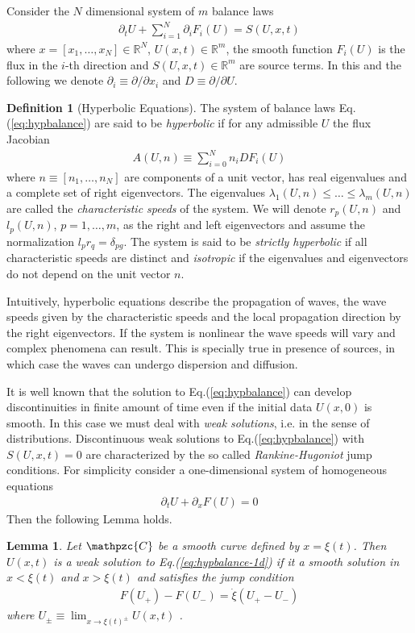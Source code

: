 \documentclass[11pt, reqno]{amsart}
\newcommand{\eqr}[1]{Eq.\thinspace(#1)}
\newcommand{\spfrac}[2]{{\partial_{#1}} {#2}}
\newcommand{\script}[1]{\mathpzc{#1}}
\newtheorem{lem}{Lemma}
\theoremstyle{definition}
\newtheorem{dfn}{Definition}
\begin{document}
Consider the $N$ dimensional system of $m$ balance laws
\begin{align}
  \spfrac{t}{U} + \sum_{i=1}^N \spfrac{i}{F_i(U)} = S(U,x,t) 
  \label{eq:hypbalance}
\end{align}
where $x = [x_1,\ldots,x_N] \in \mathbb{R}^N$, $U(x,t) \in
\mathbb{R}^m$, the smooth function $F_i(U)$ is the flux in the $i$-th
direction and $S(U,x,t) \in \mathbb{R}^m$ are source terms. In this
and the following we denote $\partial_i \equiv \partial/\partial x_i$
and $D \equiv \partial/\partial U$.

\begin{dfn}[Hyperbolic Equations]
  The system of balance laws \eqr{\ref{eq:hypbalance}} are said to be
  \emph{hyperbolic} if for any admissible $U$ the flux Jacobian
  \begin{align}
    A(U,n) \equiv \sum_{i=0}^N n_i DF_i(U)
  \end{align}
  where $n\equiv [n_1,\ldots,n_N]$ are components of a unit vector,
  has real eigenvalues and a complete set of right eigenvectors. The
  eigenvalues $\lambda_1(U,n) \le \ldots \le \lambda_m(U,n)$ are
  called the \emph{characteristic speeds} of the system. We will
  denote $r_p(U,n)$ and $l_p(U,n)$, $p=1,\ldots,m$, as the right and
  left eigenvectors and assume the normalization $l_p r_q =
  \delta_{pg}$.  The system is said to be \emph{strictly hyperbolic}
  if all characteristic speeds are distinct and \emph{isotropic} if
  the eigenvalues and eigenvectors do not depend on the unit vector
  $n$.
\end{dfn}

Intuitively, hyperbolic equations describe the propagation of waves,
the wave speeds given by the characteristic speeds and the local
propagation direction by the right eigenvectors. If the system is
nonlinear the wave speeds will vary and complex phenomena can
result. This is specially true in presence of sources, in which case
the waves can undergo dispersion and diffusion.

It is well known that the solution to \eqr{\ref{eq:hypbalance}} can
develop discontinuities in finite amount of time even if the initial
data $U(x,0)$ is smooth. In this case we must deal with \emph{weak
  solutions}, i.e. in the sense of distributions. Discontinuous weak
solutions to \eqr{\ref{eq:hypbalance}} with $S(U,x,t)=0$ are
characterized by the so called \emph{Rankine-Hugoniot} jump
conditions. For simplicity consider a one-dimensional system of
homogeneous equations
\begin{align}
  \spfrac{t}{U} + \spfrac{x}{F(U)} = 0
  \label{eq:hypbalance-1d}
\end{align}
Then the following Lemma holds.
\begin{lem}
  Let $\script{C}$ be a smooth curve defined by $x=\xi(t)$. Then
  $U(x,t)$ is a \emph{weak} solution to \eqr{\ref{eq:hypbalance-1d}}
  if it a smooth solution in $x<\xi(t)$ and $x>\xi(t)$ and satisfies
  the jump condition
  \begin{align}
    F(U_+) - F(U_-) = \dot{\xi}(U_+ - U_-)
  \end{align}
  where $U_\pm \equiv \lim_{x\rightarrow \xi(t)^\pm}U(x,t)$ .
\end{lem}
\end{document}
